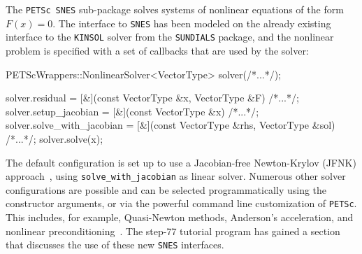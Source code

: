 \documentclass{ansarticle-preprint}
\newcommand{\specialword}[1]{\texttt{#1}}
\newcommand{\petsc}{\specialword{PETSc}\xspace}
\newcommand{\snes}{{\specialword{SNES}}\xspace}
\newcommand{\sundials}{{\specialword{SUNDIALS}}\xspace}
\newcommand{\kinsol}{{\specialword{KINSOL}}\xspace}
\begin{document}
The \petsc~\snes sub-package solves systems of nonlinear equations of the form $F(x) = 0$.
The interface to \snes has been modeled on the already existing interface
to the \kinsol solver from the \sundials package, and the nonlinear problem
is specified with a set of callbacks that are used by the solver:
\begin{c++}
PETScWrappers::NonlinearSolver<VectorType> solver(/*...*/);

solver.residual            = [&](const VectorType &x,
                                 VectorType       &F) {/*...*/};
solver.setup_jacobian      = [&](const VectorType &x) {/*...*/};
solver.solve_with_jacobian = [&](const VectorType &rhs,
                                 VectorType       &sol) {/*...*/};
solver.solve(x);
\end{c++}
The default configuration is set up to use a Jacobian-free Newton-Krylov (JFNK)
approach~\cite{knoll2004jacobian}, using \texttt{solve\_with\_jacobian} as linear solver.
Numerous other solver configurations are possible and can be selected
programmatically using the constructor arguments,
or via the powerful command line customization of \petsc.
This includes, for example, Quasi-Newton methods, Anderson's acceleration, and
nonlinear preconditioning~\cite{brune2015composing}. The step-77
tutorial program has gained a section that discusses the use of these
new \snes interfaces.
\end{document}
